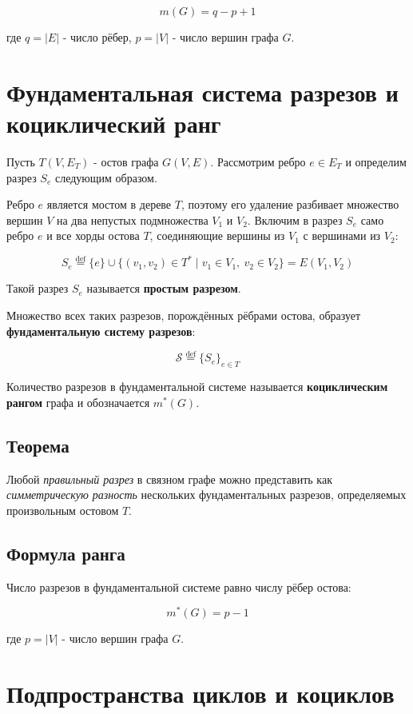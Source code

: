 {\[
m(G) = q - p + 1
\]


где $q = |E|$ - число рёбер, $p = |V|$ - число вершин графа $G$.

\section*{Фундаментальная система разрезов и коциклический ранг}

Пусть $T(V, E_T)$ - остов графа $G(V, E)$.  
Рассмотрим ребро $e \in E_T$ и определим разрез $S_e$ следующим образом.

Ребро $e$ является мостом в дереве $T$, поэтому его удаление разбивает множество вершин $V$ на два непустых подмножества $V_1$ и $V_2$.  
Включим в разрез $S_e$ само ребро $e$ и все хорды остова $T$, соединяющие вершины из $V_1$ с вершинами из $V_2$:


\[
S_e \overset{\text{def}}{=} \{e\} \cup \{(v_1, v_2) \in T^* \mid v_1 \in V_1,\ v_2 \in V_2\} = E(V_1, V_2)
\]



Такой разрез $S_e$ называется \textbf{простым разрезом}.

Множество всех таких разрезов, порождённых рёбрами остова, образует \textbf{фундаментальную систему разрезов}:


\[
\mathcal{S} \overset{\text{def}}{=} \{S_e\}_{e \in T}
\]



Количество разрезов в фундаментальной системе называется \textbf{коциклическим рангом} графа и обозначается $m^*(G)$.

\subsection*{Теорема}

Любой \emph{правильный разрез} в связном графе можно представить как \emph{симметрическую разность} нескольких фундаментальных разрезов, определяемых произвольным остовом $T$.

\subsection*{Формула ранга}

Число разрезов в фундаментальной системе равно числу рёбер остова:


\[
m^*(G) = p - 1
\]


где $p = |V|$ - число вершин графа $G$.

\section*{Подпространства циклов и коциклов}

}
